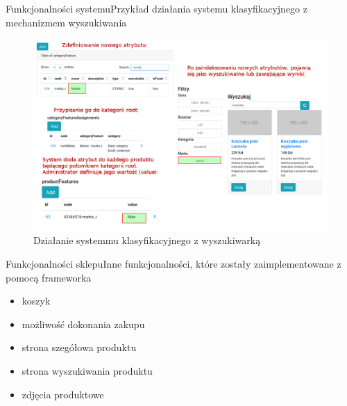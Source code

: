 \documentclass[polish,xcolor=table,9pt,aspectratio=1610,hyperref={pdfpagemode=FullScreen}]{beamer}
\begin{document}
\begin{frame}{Funkcjonalności systemu}{Przykład działania systemu klasyfikacyjnego z mechanizmem wyszukiwania}
\begin{figure}
	\begin{center}
		\includegraphics[scale=0.3]{sysklas-wyszfacet.png}
	\end{center}
	\caption{{\color{black}Działanie systemmu klasyfikacyjnego z wyszukiwarką}} 
\end{figure}
\end{frame}

\begin{frame}{Funkcjonalności sklepu}{Inne funkcjonalności, które zostały zaimplementowane z pomocą frameworka}
\begin{itemize}
	\item<1-> koszyk
	\item<1-> możliwość dokonania zakupu
	\item<1-> strona szegółowa produktu
	\item<1-> strona wyszukiwania produktu
	\item<1-> zdjęcia produktowe
\end{itemize}
\end{frame}
\end{document}
